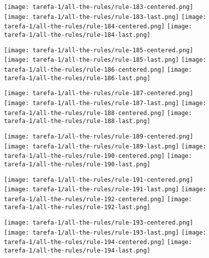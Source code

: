 \begin{figure}[htbp]
  \centering
\texttt{[image: tarefa-1/all-the-rules/rule-183-centered.png]}
\texttt{[image: tarefa-1/all-the-rules/rule-183-last.png]}
\texttt{[image: tarefa-1/all-the-rules/rule-184-centered.png]}
\texttt{[image: tarefa-1/all-the-rules/rule-184-last.png]}
\end{figure}
\begin{figure}[htbp]
  \centering
\texttt{[image: tarefa-1/all-the-rules/rule-185-centered.png]}
\texttt{[image: tarefa-1/all-the-rules/rule-185-last.png]}
\texttt{[image: tarefa-1/all-the-rules/rule-186-centered.png]}
\texttt{[image: tarefa-1/all-the-rules/rule-186-last.png]}
\end{figure}
\begin{figure}[htbp]
  \centering
\texttt{[image: tarefa-1/all-the-rules/rule-187-centered.png]}
\texttt{[image: tarefa-1/all-the-rules/rule-187-last.png]}
\texttt{[image: tarefa-1/all-the-rules/rule-188-centered.png]}
\texttt{[image: tarefa-1/all-the-rules/rule-188-last.png]}
\end{figure}
\begin{figure}[htbp]
  \centering
\texttt{[image: tarefa-1/all-the-rules/rule-189-centered.png]}
\texttt{[image: tarefa-1/all-the-rules/rule-189-last.png]}
\texttt{[image: tarefa-1/all-the-rules/rule-190-centered.png]}
\texttt{[image: tarefa-1/all-the-rules/rule-190-last.png]}
\end{figure}
\begin{figure}[htbp]
  \centering
\texttt{[image: tarefa-1/all-the-rules/rule-191-centered.png]}
\texttt{[image: tarefa-1/all-the-rules/rule-191-last.png]}
\texttt{[image: tarefa-1/all-the-rules/rule-192-centered.png]}
\texttt{[image: tarefa-1/all-the-rules/rule-192-last.png]}
\end{figure}
\begin{figure}[htbp]
  \centering
\texttt{[image: tarefa-1/all-the-rules/rule-193-centered.png]}
\texttt{[image: tarefa-1/all-the-rules/rule-193-last.png]}
\texttt{[image: tarefa-1/all-the-rules/rule-194-centered.png]}
\texttt{[image: tarefa-1/all-the-rules/rule-194-last.png]}
\end{figure}
